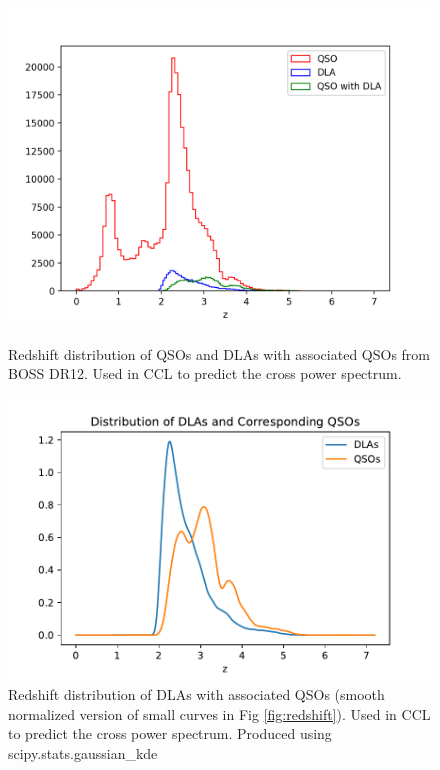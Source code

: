 \documentclass{amsart}
\begin{document}
\begin{figure}
  \includegraphics[width=\linewidth]{redshift.png}
  \caption{Redshift distribution of QSOs and DLAs with associated QSOs from BOSS DR12. Used in CCL to predict the cross power spectrum.}
  \label{fig:redshift}
  
    \includegraphics[width=\linewidth]{rdshift_ccl.pdf}
  \caption{Redshift distribution of DLAs with associated QSOs (smooth normalized version of small curves in Fig \ref{fig:redshift}). Used in CCL to predict the cross power spectrum. Produced using scipy.stats.gaussian\_kde}
  \label{fig:rdshift}
\end{figure}
\end{document}
